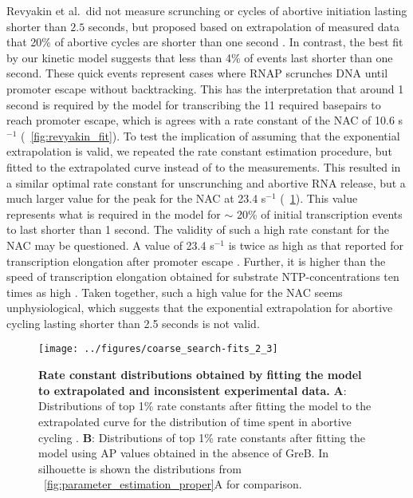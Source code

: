 Revyakin et al.\ did not measure scrunching or cycles of abortive initiation
lasting shorter than $2.5$ seconds, but proposed based on extrapolation of
measured data that 20\% of abortive cycles are shorter than one second
\cite{revyakin_abortive_2006}. In contrast, the best fit by our kinetic model
suggests that less than 4\% of events last shorter than one second. These
quick events represent cases where RNAP scrunches DNA until promoter escape
without backtracking. This has the interpretation that around 1 second is
required by the model for transcribing the 11 required basepairs to reach
promoter escape, which is agrees with a rate constant of the NAC of 10.6
s$^{-1}$ (\FIG~\ref{fig:revyakin_fit}). To test the implication of assuming
that the exponential extrapolation is valid, we repeated the rate constant
estimation procedure, but fitted to the extrapolated curve instead of to the
measurements. This resulted in a similar optimal rate constant for
unscrunching and abortive RNA release, but a much larger value for the peak
for the NAC at 23.4 s$^{-1}$ (\FIG~\ref{fig:extrap_and_GreB_minus_fit}). This
value represents what is required in the model for $\sim$ 20\% of initial
transcription events to last shorter than 1 second. The validity of such a
high rate constant for the NAC may be questioned. A value of 23.4 s$^{-1}$ is
twice as high as that reported for transcription elongation after promoter
escape \cite{revyakin_abortive_2006}. Further, it is higher than the speed of
transcription elongation obtained for substrate NTP-concentrations ten times
as high \cite{bai_mechanochemical_2007}. Taken together, such a high value for
the NAC seems unphysiological, which suggests that the exponential
extrapolation for abortive cycling lasting shorter than 2.5 seconds is not
valid.

\begin{figure}[h]
    \begin{center}
      \texttt{[image: ../figures/coarse\_search-fits\_2\_3]}
    \end{center}
    \caption{
      {\bf Rate constant distributions obtained by fitting the model to
      extrapolated and inconsistent experimental data.} \textbf{A}:
      Distributions of top 1\% rate constants after fitting the model to the
      extrapolated curve for the distribution of time spent in abortive
      cycling \cite{revyakin_abortive_2006}. \textbf{B}: Distributions of top
      1\% rate constants after fitting the model using AP values obtained in the
      absence of GreB. In silhouette is shown the distributions from
      \FIG~\ref{fig:parameter_estimation_proper}A for comparison.}
      \label{fig:extrap_and_GreB_minus_fit}
\end{figure}

